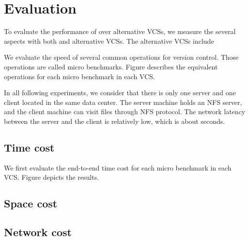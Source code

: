 \section{Evaluation}

To evaluate the performance of \sys over alternative VCSs, we measure the
several aspects with both \sys and alternative VCSs. The alternative VCSs
include 

We evaluate the speed of several common operations for version control. Those
operations are called micro benchmarks. Figure 
describes the equivalent operations for each micro benchmark in each VCS.

In all following experiments, we consider that there is only one server and one
client located in the same data center. The server machine holds an NFS server,
and the client machine can visit files through NFS protocol. The network latency
between the server and the client is relatively low, which is about
 seconds. 

\subsection{Time cost}

We first evaluate the end-to-end time cost for each micro benchmark in each VCS.
Figure  depicts the results. 

\subsection{Space cost}

\subsection{Network cost}

